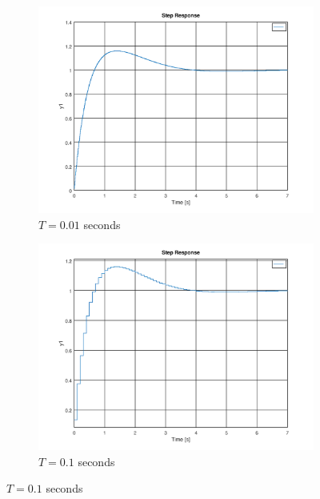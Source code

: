 \documentclass[a4paper, 12pt]{article}
\begin{document}
\begin{figure}[H]
  \centering
  \begin{subfigure}{.6\textwidth}
    \includegraphics[width=\textwidth]{./img/2_5_tustin001.png}
    \caption{$T = 0.01$ seconds}
    \label{fig:tustin001}
  \end{subfigure}

  \begin{subfigure}{.6\textwidth}
    \includegraphics[width=\textwidth]{./img/2_5_tustin01.png}
    \caption{$T = 0.1$ seconds}
    \label{fig:tustin01}
  \end{subfigure}
  

\end{figure}
\end{document}
